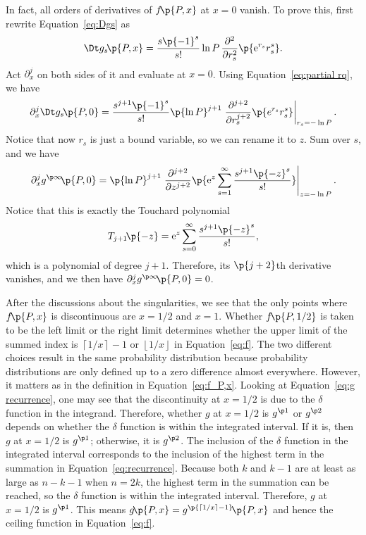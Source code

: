 \documentclass[oneside,12pt,final]{ucthesis-CA2012}
\newcommand{\mrm}[1]{\mathrm{#1}}
\newcommand{\dlt}{\delta}
\newcommand{\e}{\mrm{e}}
\newcommand{\fr}{\frac}
\newcommand{\fc}[2]{#1\mathchoice{\!}{\!}{}{}\p{#2}} %
\newcommand{\abar}[2]{\left.#1\right|_{#2}} %
\newcommand\floor[1]{\left\lfloor#1\right\rfloor}
\newcommand\ceil[1]{\left\lceil#1\right\rceil}
\begin{document}
\begin{mainmatter}
In fact, all orders of derivatives of $\fc f{P,x}$ at $x=0$ vanish.
To prove this, first rewrite Equation~\ref{eq:Dgs} as
\begin{equation}
	\label{eq:Dgs partial r_s}
	\fc{\Dt g_s}{P,x}=\fr{s\p{-1}^s}{s!}\ln P\,\fr{\partial^2}{\partial r_s^2}\p{\e^{r_s}r_s^s}.
\end{equation}
Act $\partial_x^j$ on both sides of it and evaluate at $x=0$.
Using Equation~\ref{eq:partial rq}, we have
\[\partial_x^j\fc{\Dt g_s}{P,0}=\fr{s^{j+1}\p{-1}^s}{s!}\p{\ln P}^{j+1}
\abar{\fr{\partial^{j+2}}{\partial r_s^{j+2}}\p{e^{r_s}r_s^s}}{r_s=-\ln P}.\]
Notice that now $r_s$ is just a bound variable, so we can rename it to $z$.
Sum over $s$, and we have
\[\partial_x^j\fc{g^{\p\infty}}{P,0}
=\p{\ln P}^{j+1}\abar{\fr{\partial^{j+2}}{\partial z^{j+2}}
\p{\e^z\sum_{s=1}^\infty\fr{s^{j+1}\p{-z}^s}{s!}}}{z=-\ln P}.\]
Notice that this is exactly the Touchard polynomial \cite{Boyadzhiev_2009}
\[\fc{T_{j+1}}{-z}=\e^z\sum_{s=0}^\infty\fr{s^{j+1}\p{-z}^s}{s!},\]
which is a polynomial of degree $j+1$.
Therefore, its $\p{j+2}$th derivative vanishes, and we then have
$\partial_x^j\fc{g^{\p\infty}}{P,0}=0$.

After the discussions about the singularities,
we see that the only points where $\fc f{P,x}$ is discontinuous
are $x=1/2$ and $x=1$.
Whether $\fc f{P,1/2}$ is taken to be the left limit or the right limit
determines whether the upper limit of the summed index
is $\ceil{1/x}-1$ or $\floor{1/x}$ in Equation~\ref{eq:f}.
The two different choices result in the same probability distribution
because probability distributions are only defined up to
a zero difference almost everywhere.
However, it matters as in the definition in Equation~\ref{eq:f_P,x}.
Looking at Equation~\ref{eq:g recurrence}, one may see that
the discontinuity at $x=1/2$ is due to the $\dlt$ function in the integrand.
Therefore, whether $g$ at $x=1/2$ is $g^{\p1}$ or $g^{\p2}$
depends on whether the $\dlt$ function is within the integrated interval.
If it is, then $g$ at $x=1/2$ is $g^{\p1}$; otherwise, it is $g^{\p2}$.
The inclusion of the $\dlt$ function in the integrated interval
corresponds to the inclusion of the highest term in the summation
in Equation~\ref{eq:recurrence}.
Because both $k$ and $k-1$ are at least as large as $n-k-1$ when $n=2k$,
the highest term in the summation can be reached,
so the $\dlt$ function is within the integrated interval.
Therefore, $g$ at $x=1/2$ is $g^{\p1}$.
This means $\fc g{P,x}=\fc{g^{\p{\ceil{1/x}-1}}}{P,x}$
and hence the ceiling function in Equation~\ref{eq:f}.


\end{mainmatter}
\end{document}
